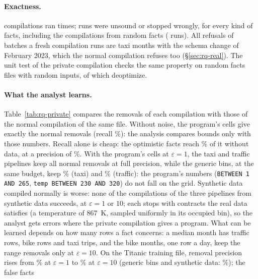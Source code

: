\paragraph{Exactness.} \PrivCompilations{} compilations ran \PrivRuns{} times; \PrivUnsound{} runs were
unsound or stopped wrongly, for every kind of facts, including the \PrivRandom{} compilations from random
facts (\PrivRandomRuns{} runs). All \PrivNeedless{} refusals of batches a fresh compilation runs are taxi
months with the schema change of February 2023, which the normal compilation refuses too
(\S\ref{sec:rq-real}). The unit test of the private compilation checks the same property on
\PrivTestFacts{} random facts files with random inputs, \PrivTestDeopt{} of which deoptimize.

\paragraph{What the analyst learns.} Table~\ref{tab:rq-private} compares the removals of each compilation
with those of the normal compilation of the same file. Without noise, the program's cells give exactly the
normal removals (recall \PrivExactRecall\%): the analysis compares bounds only with those numbers. Recall
alone is cheap: the optimistic facts reach \PrivOptimisticRecall\% of it without data, at a precision of
\PrivOptimisticPrecision\%. With the program's cells at $\varepsilon = 1$, the taxi and traffic pipelines
keep all normal removals at full precision, while the generic bins, at the same budget, keep
\PrivGenTaxiEpsOneRecall\% (taxi) and \PrivGenTrafficEpsOneRecall\% (traffic): the program's numbers
(\texttt{BETWEEN 1 AND 265}, \texttt{temp BETWEEN 230 AND 320}) do not fall on the grid. Synthetic data
compiled normally is worse: none of the \PrivSynEpsOneFailed{} compilations of the three pipelines from
synthetic data succeeds, at $\varepsilon = 1$ or $10$; each stops with contracts the real data satisfies
(a temperature of 867~K, sampled uniformly in its occupied bin), so the analyst gets errors where the
private compilation gives a program. What can be
learned depends on how many rows a fact concerns: a median month has \PrivTrafficRows{} traffic rows,
\PrivBikesRows{} bike rows and \PrivTaxiRows{} taxi trips, and the bike months, one row a day, keep the
range removals only at $\varepsilon = 10$. On the Titanic training file, removal precision rises from
\PrivProgTitanicEpsOnePrecision\% at $\varepsilon = 1$ to \PrivProgTitanicEpsTenPrecision\% at
$\varepsilon = 10$ (generic bins and synthetic data: \PrivGenTitanicEpsTenPrecision\%); the false facts
